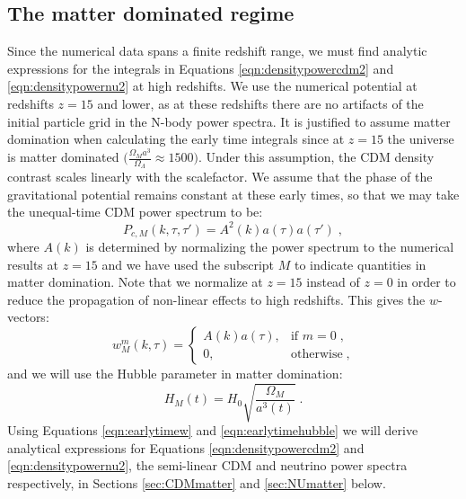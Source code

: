 \documentclass[twocolumn,superscriptaddress,prd]{revtex4}
\begin{document}
\subsection{ The matter dominated regime}
Since the numerical data spans a finite redshift range, 
we must find analytic expressions for the integrals in Equations 
\eqref{eqn:densitypowercdm2} and 
\eqref{eqn:densitypowernu2} at high redshifts.
We use the numerical potential at redshifts $z=15$ and
lower, as at these
redshifts there are no artifacts of the initial particle grid in the
N-body power spectra.  
It is justified to assume matter domination when calculating the early
time integrals since at $z=15$ the universe
is matter dominated $\bigg(\frac{\Omega_M a^3}{\Omega_\Lambda} \approx
1500\bigg)$.  Under this
assumption, the CDM density contrast scales linearly with the
scalefactor.  We assume that the phase of the
gravitational potential remains constant at these early times, so
that we may take the unequal-time CDM power spectrum to be:
\begin{equation}\label{eqn:earlytimespectrum}
  P_{c,M}(k, \tau,\tau') = A^2(k) a(\tau) a(\tau') \;,
\end{equation}
where $A(k)$ is determined by
normalizing the power spectrum to the numerical results at $z=15$ and
we have used the subscript $M$ to indicate quantities in matter domination.  Note that we normalize at
$z=15$ instead of $z=0$ in order to reduce the propagation of non-linear
effects to high redshifts. 
This gives the $w$-vectors:
\begin{equation}\label{eqn:earlytimew}
  w_M^m(k,\tau) = 
  \begin{cases} 
    A(k) a(\tau), & \text{if } m = 0\;, \\
    0, & \text{otherwise} \;,
  \end{cases}
\end{equation}
and we will use the Hubble parameter in
matter domination:
\begin{equation}\label{eqn:earlytimehubble}
  H_M(t) = H_0 \sqrt{ \frac{\Omega_M}{a^3(t)} }\;.
\end{equation}
Using Equations \eqref{eqn:earlytimew} and
\eqref{eqn:earlytimehubble} we will derive analytical expressions for
Equations \eqref{eqn:densitypowercdm2} and \eqref{eqn:densitypowernu2},
the semi-linear CDM and neutrino power spectra respectively, in Sections
\ref{sec:CDMmatter} and \ref{sec:NUmatter} below.
\end{document}
